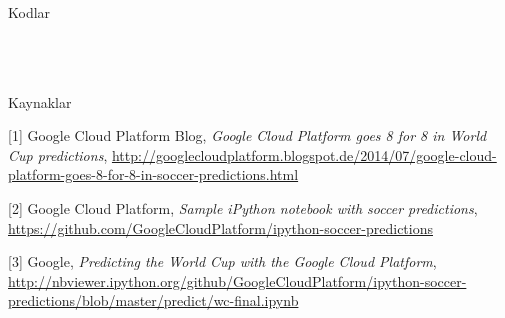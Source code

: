 \documentclass[12pt,fleqn]{article}\usepackage{../../common}
\begin{document}
Kodlar

\inputminted[fontsize=\footnotesize]{python}{world_cup.py}

\inputminted[fontsize=\footnotesize]{python}{power.py}

\inputminted[fontsize=\footnotesize]{python}{features.py}

\inputminted[fontsize=\footnotesize]{python}{match_stats.py}

Kaynaklar

[1] Google Cloud Platform Blog, {\em Google Cloud Platform goes 8 for 8 in World Cup predictions}, \url{http://googlecloudplatform.blogspot.de/2014/07/google-cloud-platform-goes-8-for-8-in-soccer-predictions.html}

[2] Google Cloud Platform, {\em Sample iPython notebook with soccer predictions}, \url{https://github.com/GoogleCloudPlatform/ipython-soccer-predictions}

[3] Google, {\em Predicting the World Cup with the Google Cloud Platform}, \url{http://nbviewer.ipython.org/github/GoogleCloudPlatform/ipython-soccer-predictions/blob/master/predict/wc-final.ipynb}
\end{document}
